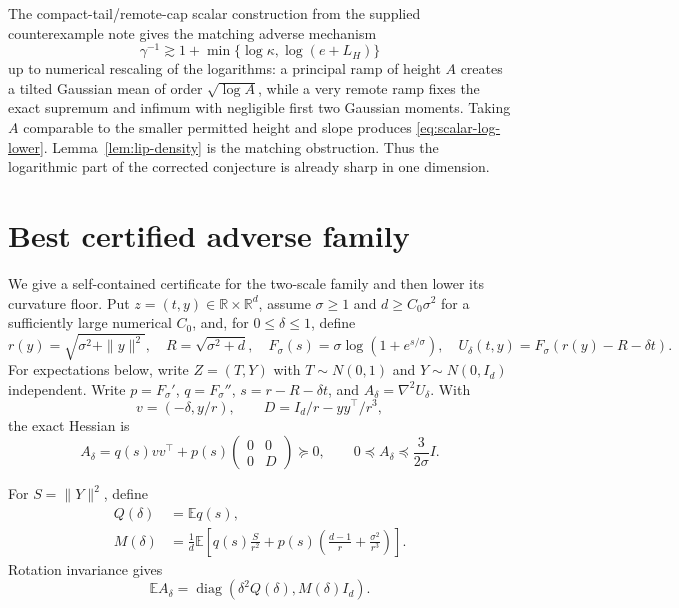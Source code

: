 \documentclass[11pt]{article}
\numberwithin{equation}{section}
\newcommand{\E}{\mathbb E}
\newcommand{\R}{\mathbb R}
\begin{document}
The compact-tail/remote-cap scalar construction from the supplied
counterexample note gives the matching adverse mechanism
\begin{equation}\label{eq:scalar-log-lower}
 \gamma^{-1}\gtrsim
 1+\min\{\log\kappa,\log(e+L_H)\}
\end{equation}
up to numerical rescaling of the logarithms: a principal ramp of height
$A$ creates a tilted Gaussian mean of order $\sqrt{\log A}$, while a very
remote ramp fixes the exact supremum and infimum with negligible first two
Gaussian moments.  Taking $A$ comparable to the smaller permitted height
and slope produces \eqref{eq:scalar-log-lower}.  Lemma~\ref{lem:lip-density}
is the matching obstruction.  Thus the logarithmic part of the corrected
conjecture is already sharp in one dimension.

\section{Best certified adverse family}\label{sec:family}

We give a self-contained certificate for the two-scale family and then
lower its curvature floor.  Put $z=(t,y)\in\R\times\R^d$, assume
$\sigma\ge1$ and $d\ge C_0\sigma^2$ for a sufficiently large numerical
$C_0$, and, for $0\le\delta\le1$, define
\begin{equation}\label{eq:family-def}
 r(y)=\sqrt{\sigma^2+\|y\|^2},\quad
 R=\sqrt{\sigma^2+d},\quad
 F_\sigma(s)=\sigma\log(1+e^{s/\sigma}),\quad
 U_\delta(t,y)=F_\sigma(r(y)-R-\delta t).
\end{equation}
For expectations below, write $Z=(T,Y)$ with
$T\sim N(0,1)$ and $Y\sim N(0,I_d)$ independent.
Write $p=F_\sigma'$, $q=F_\sigma''$, $s=r-R-\delta t$, and
$A_\delta=\nabla^2U_\delta$.  With
\[
 v=(-\delta,y/r),\qquad
 D=I_d/r-yy^\top/r^3,
\]
the exact Hessian is
\begin{equation}\label{eq:family-A}
 A_\delta=q(s)vv^\top+p(s)
 \begin{pmatrix}0&0\\0&D\end{pmatrix}\succeq0,\qquad
 0\preceq A_\delta\preceq\frac{3}{2\sigma}I.
\end{equation}

For $S=\|Y\|^2$, define
\begin{align}
 Q(\delta)&=\E q(s),\label{eq:Q}\\
 M(\delta)&=\frac1d\E\left[q(s)\frac S{r^2}
 +p(s)\left(\frac{d-1}{r}+\frac{\sigma^2}{r^3}\right)\right].
 \label{eq:M}
\end{align}
Rotation invariance gives
\begin{equation}\label{eq:EA-diag}
 \E A_\delta=\operatorname{diag}(\delta^2Q(\delta),M(\delta)I_d).
\end{equation}
\end{document}
